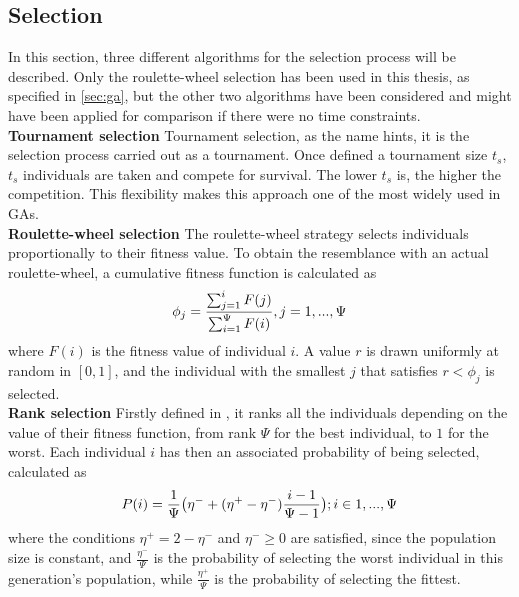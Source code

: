 \subsection{Selection}\label{subsec:selection}
In this section, three different algorithms for the selection process will be described. Only the roulette-wheel selection has been used in this thesis, as specified in \ref{sec:ga}, but the other two algorithms have been considered and might have been applied for comparison if there were no time constraints.\\
\textbf{Tournament selection}\qquad
Tournament selection, as the name hints, it is the selection process carried out as a tournament. Once defined a tournament size $t_s$, $t_s$ individuals are taken and compete for survival. The lower $t_s$ is, the higher the competition. This flexibility makes this approach one of the most widely used in GAs\cite{miller1995genetic}.\\
\textbf{Roulette-wheel selection}\qquad
The roulette-wheel strategy selects individuals proportionally to their fitness value. To obtain the resemblance with an actual roulette-wheel, a cumulative fitness function is calculated as $$\phi_j=\frac{\sum^i_{j=1} F(j)}{\sum^\Psi_{i=1} F(i)},\hfill j=1,...,\Psi$$ where $F(i)$ is the fitness value of individual $i$. A value $r$ is drawn uniformly at random in $[0,1]$, and the individual with the smallest $j$ that satisfies $r<\phi_j$ is selected\cite{wahde2008biologically}. \\
\textbf{Rank selection}\qquad
Firstly defined in \cite{baker1985adaptive}, it ranks all the individuals depending on the value of their fitness function, from rank $\Psi$ for the best individual, to $1$ for the worst. Each individual $i$ has then an associated probability of being selected, calculated as $$P(i)=\frac{1}{\Psi}\big(\eta^-+(\eta^+-\eta^-)\frac{i-1}{\Psi-1}\big);\hfill i\in{1,...,\Psi}$$ where the conditions $\eta^+=2-\eta^-$ and $\eta^-\geq0$ are satisfied, since the population size is constant, and $\frac{\eta^-}{\Psi}$ is the probability of selecting the worst individual in this generation's population, while $\frac{\eta^+}{\Psi}$ is the probability of selecting the fittest\cite{blickle1995comparison}.
